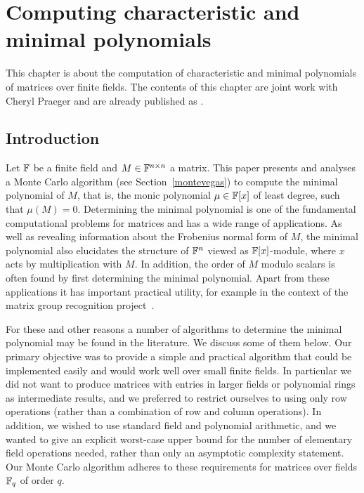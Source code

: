 
\chapter{Computing characteristic and minimal polynomials}
\label{chap:charminpoly}
%

This chapter is about the computation of characteristic and minimal
polynomials of matrices over finite fields. The contents of this
chapter are joint work with Cheryl
Praeger and are already published as \cite{minpolypaper}.

\section{Introduction}

Let $\mathbb{F}$ be a finite field and $M \in \mathbb{F}^{n \times n}$ a matrix. This paper
presents and analyses a Monte Carlo  algorithm (see
Section~\ref{montevegas}) to compute the minimal 
polynomial of $M$, that is,
the monic polynomial $\mu \in \mathbb{F}[x]$ of least degree, such that
$\mu(M) = 0$. 
Determining the minimal polynomial is one of the fundamental computational
problems for matrices and has a wide range of applications. As well as 
revealing information about the Frobenius
normal form of $M$, the minimal polynomial also elucidates the structure 
of $\mathbb{F}^n$ viewed as $\mathbb{F}[x]$-module, where $x$ acts by multiplication with $M$. 
In addition, the order of $M$ modulo scalars is often found by first 
determining the minimal polynomial. Apart from these applications it has
important practical utility, for example
in the context of the matrix group recognition project~\cite{OB}.

For these and other reasons a number of algorithms to determine the 
minimal polynomial may be found in the literature. We discuss some 
of them below. Our primary objective 
was to provide a simple and practical algorithm that could be 
implemented easily and would work well over small finite fields. In
particular we did not want to produce matrices with entries in 
larger fields or polynomial rings as intermediate results, 
and we preferred to restrict ourselves to using only row operations 
(rather than a combination of row and column operations). 
In addition, we wished to use standard field and polynomial arithmetic,
and we wanted to give  an explicit worst-case upper bound
for the number of elementary field operations needed, rather than only an
asymptotic complexity statement.
Our Monte Carlo algorithm adheres to these requirements for matrices 
over fields $\mathbb{F}_q$ of order $q$.

